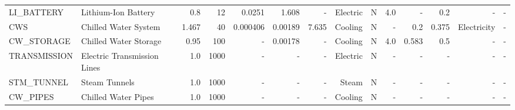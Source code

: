 \begin{tabular}{llrrrrrrrrrrrr}
  LI\_BATTERY &         Lithium-Ion Battery &        0.8 &        12 &                  0.0251 &                   1.608 &                    - &      Electric &               N &                      4.0 &       - &                 0.2 &          - &                     - \\
         CWS &        Chilled Water System &      1.467 &        40 &                0.000406 &                0.00189 &                 7.635 & Cooling &               N &                      - &       0.2 &               0.375 &  Electricity &                     - \\
  CW\_STORAGE &       Chilled Water Storage &       0.95 &       100 &                     - &                0.00178 &                    - & Cooling &               N &                      4.0 &     0.583 &                 0.5 &          - &                     - \\
TRANSMISSION & Electric Transmission Lines &        1.0 &      1000 &                     - &                     - &                    - &      Electric &               N &                      - &       - &                 - &          - &                     - \\
  STM\_TUNNEL &               Steam Tunnels &        1.0 &      1000 &                     - &                     - &                    - &         Steam &               N &                      - &       - &                 - &          - &                     - \\
    CW\_PIPES &         Chilled Water Pipes &        1.0 &      1000 &                     - &                     - &                    - & Cooling &               N &                      - &       - &                 - &          - &                     - \\
\bottomrule
\end{tabular}
